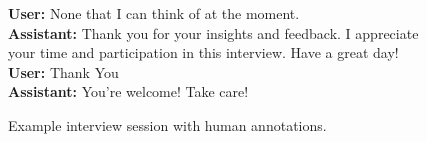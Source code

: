 \begin{figure*}[h]
{\begin{tcolorbox}[colback=gray!1, colframe=black!50, title=Example User Experience Interview Session with Human Annotations]
    \textbf{User:} None that I can think of at the moment.\\
    
    \textbf{Assistant:} Thank you for your insights and feedback. I appreciate your time and participation in this interview. Have a great day!\\
    
    \textbf{User:} Thank You\\
    
    \textbf{Assistant:} You're welcome! Take care!\\
        
    \end{tcolorbox}}
    \caption{Example interview session with human annotations.}
    \label{fig:chatbot_interview}
\end{figure*}